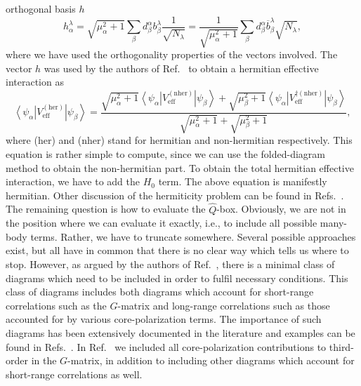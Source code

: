 \documentclass{article}
\begin{document}
orthogonal basis $h$
\begin{equation}
  h_{\alpha}^{\lambda}=\sqrt{\mu_{\alpha}^2+1}\sum_{\beta}
  d_{\beta}^{\alpha}b_{\beta}^{\lambda}\frac{1}{\sqrt{N_{\lambda}}}
  =\frac{1}{\sqrt{\mu_{\alpha}^2+1}}\sum_{\beta}
  d_{\beta}^{\alpha}\overline{b}_{\beta}^{\lambda}\sqrt{N_{\lambda}},
  \label{eq:hbasis}
\end{equation}
where we have used the orthogonality properties of the vectors
involved. The vector $h$ was used by the authors of Ref.\ \cite{kehlsok93}
to obtain a hermitian effective interaction as
\begin{equation}
   \left\langle \psi_{\alpha}\right |
   V_{\mathrm{eff}}^{\mathrm{(her)}}\left | \psi_{\beta}\right\rangle=
   \frac{\sqrt{\mu_{\alpha}^2+1}\left\langle \psi_{\alpha} \right |
   V_{\mathrm{eff}}^{\mathrm{(nher)}}\left | \psi_{\beta}\right\rangle
   +\sqrt{\mu_{\beta}^2+1}\left\langle \psi_{\alpha}\right |
   V_{\mathrm{eff}}^{\dagger\mathrm{(nher)}}\left |
   \psi_{\beta} \right\rangle}
   {\sqrt{\mu_{\alpha}^2+1}+\sqrt{\mu_{\beta}^2+1} },
   \label{eq:hermitian}
\end{equation}
where (her) and (nher) stand for hermitian and non-hermitian
respectively.
This equation is rather simple to compute, since
we can use the folded-diagram method
to obtain the non-hermitian part.
To obtain the total hermitian effective interaction, we have to
add the $H_0$ term. The above equation is manifestly hermitian.
Other discussion of the hermiticity problem can be found
in Refs.\ \cite{lm85,arponen97}.
The remaining question is how to evaluate the $\hat{Q}$-box.
Obviously, we are not in the position where we can evaluate it
exactly, i.e., to include all possible many-body terms.
Rather, we have to truncate somewhere.
Several possible approaches exist, but all have in common that
there is no clear way which tells us where to stop.
However, as argued by the authors of Ref.\ \cite{jls82}, there is a
minimal class of diagrams which need to be included
in order to fulfil necessary conditions. This class
of diagrams includes both diagrams which account for short-range
correlations such as the $G$-matrix and long-range
correlations such as those accounted for by various
core-polarization terms.
The importance of such diagrams has been extensively documented
in the literature and examples can be found
in Refs.\ \cite{hko95,eo77}. In Ref.\ \cite{hko95} we included
all core-polarization contributions to third-order
in the $G$-matrix, in addition to including other diagrams
which account for short-range correlations as well.
\end{document}
